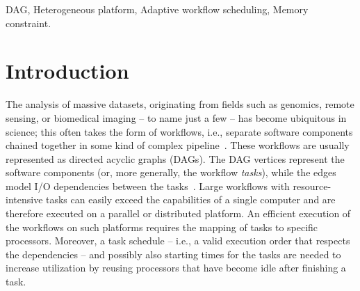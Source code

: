 \documentclass[conference]{IEEEtran}
\newcommand{\new}[1]{{\color{blue}#1}}
\newcommand{\skug}[1]{{\color{blue}[SK: #1]}}
\renewcommand{\iec}{i.e., }
\begin{document}
\begin{abstract}

\end{abstract}

    \begin{IEEEkeywords}
        DAG, Heterogeneous platform, Adaptive \new{workflow} scheduling, Memory constraint.
    \end{IEEEkeywords}

\section{Introduction} %

The analysis of massive datasets, originating from fields such as genomics, 
remote sensing, or biomedical imaging -- to name just a few -- has become ubiquitous in science;
this often takes the form of workflows, \iec separate software components chained together
in some kind of complex pipeline~\cite{DBLP:journals/dbsk/LeserHDEGHKKKKK21}.
These workflows are usually represented as directed acyclic graphs (DAGs).
The DAG vertices represent the software components (or, more generally, the workflow \emph{tasks}),
while the edges model I/O dependencies between the tasks~\cite{adhikari2019survey,liu2018survey}.
Large workflows with resource-intensive tasks can easily exceed the capabilities of a 
single computer and are therefore executed on a parallel or distributed platform.
An efficient execution of the workflows on such platforms requires the mapping of tasks
to specific processors.
\new{Moreover, a task schedule -- \iec a valid execution order that respects the dependencies --
and possibly also starting times for the tasks are needed to increase utilization by reusing 
processors that have become idle after finishing a task.}
\end{document}
